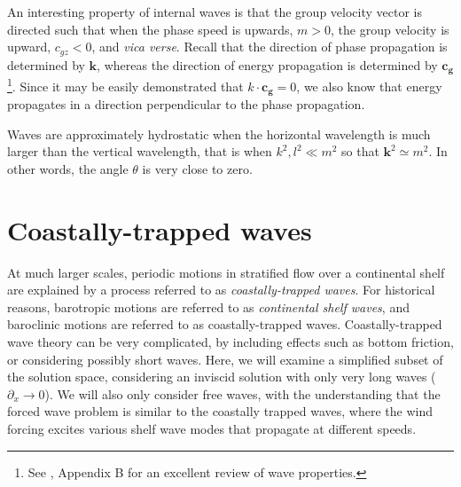 \documentclass[11pt]{report}
\numberwithin{equation}{section}
\begin{document}
An interesting property of internal waves is that the group velocity vector is directed such that when the phase speed is upwards, $m>0$, the group velocity is upward, $c_{gz}<0$, and \emph{vica verse}.  Recall that the direction of phase propagation is determined by $\mathbf{k}$, whereas the direction of energy propagation is determined by $\mathbf{c_g}$\footnote{See \citet{cushman-roisin.beckers:11}, Appendix B for an excellent review of wave properties.}.  Since it may be easily demonstrated that $k\cdot\mathbf{c_g} = 0$, we also know that energy propagates in a direction perpendicular to the phase propagation.

Waves are approximately hydrostatic when the horizontal wavelength is much larger than the vertical wavelength, that is when $k^2, l^2 \ll m^2$ so that $\mathbf{k}^2 \simeq m^2$.  In other words, the angle $\theta$ is very close to zero.









\section{Coastally-trapped waves}

At much larger scales, periodic motions in stratified flow over a continental shelf are explained by a process referred to as \emph{coastally-trapped waves}.  For historical reasons, barotropic motions are referred to as \emph{continental shelf waves}, and baroclinic motions are referred to as coastally-trapped waves.  Coastally-trapped wave theory can be very complicated, by including effects such as bottom friction, or considering possibly short waves.  Here, we will examine a simplified subset of the solution space, considering an inviscid solution with only very long waves ($\partial_x \rightarrow 0$).  We will also only consider free waves, with the understanding that the forced wave problem is similar to the coastally trapped waves, where the wind forcing excites various shelf wave modes that propagate at different speeds.
\end{document}
